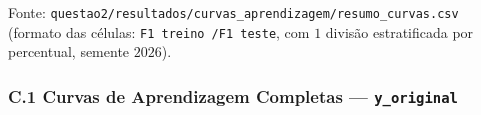 \documentclass[a4paper,11pt]{article}
\begin{document}
Fonte: \texttt{questao2/\allowbreak resultados/\allowbreak curvas\_\allowbreak aprendizagem/\allowbreak resumo\_\allowbreak curvas.csv} (formato das células: \texttt{F1 treino /\allowbreak  F1 teste}, com $1$ divisão estratificada por percentual, semente $2026$).

\subsubsection*{\texorpdfstring{C.1 Curvas de Aprendizagem Completas --- \texttt{y\_original}}{C.1 Curvas de Aprendizagem Completas - yoriginal}}\label{sec:c-1-curvas-de-aprendizagem-completas-yoriginal}
\end{document}
